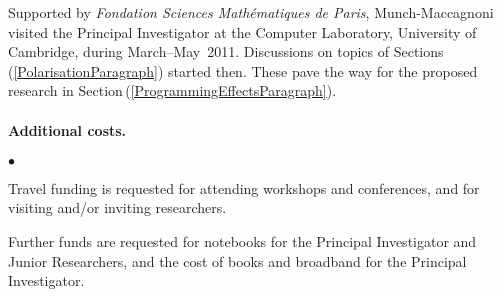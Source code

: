 \documentclass[11pt,twocolumn]{article}
\newenvironment{myitemize}
  {\begin{list}{$\bullet$}
  {\setlength{\topsep}{2pt}
   \setlength{\partopsep}{2pt}
   \setlength{\itemsep}{2.5pt}
   \setlength{\parsep}{2.5pt}
   \setlength{\leftmargin}{1em}
   \setlength{\labelwidth}{.5em}}}
  {\end{list}}
\newcommand{\hidefootnote}[2]{}
\newcommand{\pref}[1]{\,(\ref{#1})}
\newcommand{\Eg}{\emph{Eg.}}
\begin{document}
Supported by \emph{Fondation Sciences Math\'ematiques de Paris},
Munch-Maccagnoni visited the Principal Investigator at the Computer
Laboratory, University of Cambridge, during March--May~2011.  Discussions on
topics of Sections\pref{PolarisationParagraph} started then.  These pave the
way for the proposed research in Section\pref{ProgrammingEffectsParagraph}.


\paragraph*{Additional costs.}

\begin{myitemize}
\item
Travel funding is requested for attending workshops and 
conferences, \hidefootnote{\Eg~CALCO, CIE, CSL, CT, ICALP, ICFP, LICS, MFPS,
  POPL, PPDP, PSSL, RTA, TLCA, TYPES, WOLLIC.}, 
and for visiting and/or inviting researchers. \hidefootnote{\Eg~Aarhus
  (A\,Kock); 
  Bamberg (Mendler);
  Barcelona (J\,Kock);
  Bath (Power); 
  Berkeley (D\,Scott); 
  Birmingham (Escard\'o, Levy); 
  Bologna (Asperti, Dal Lago);
  Buffalo (Lawvere);
  Copenhagen (Birkedal, Filinski); 
  Darmstadt (Streicher); 
  Dublin (Dotsenko);
  Edinburgh (Leinster, Plotkin, A\,Simpson); 
  Genova (Moggi, Rosolini); 
  G\"oteborg (Coquand, Dybjer);
  Gunma (Hamana);
  Ljubljana (Bauer, Pretnar);
  London (Oliva);
  Manchester (Aczel);
  Marseille (Girard, Lafont, Regnier); 
  Montreal (Joyal, Makkai, Panangaden);
  Munich (Abel, Hofmann);
  Nice (C\,Simpson, Vallette);
  Nijmegen (Moerdijk);
  Nottingham (Altenkirch);
  Ottawa (P\,Scott); 
  Oxford (Abramsky, Coecke, Doring); 
  Paris (Burroni, Curien, Herbelin, Krivine, Melli\`es, Metayer);
  Philadelphia (Freyd, Pierce, Weirich);
  Pittsburgh (Avigad, Awodey, Harper, Pfenning, Reynolds);
  Portland (Sheard);
  Princeton (Warren);
  Strathclyde (Ghani, McBride);
  Swansea (Beckmann, Berger);
  Sydney (Garner, Lack, Street);
  Warsaw (Zawadowski).}.
\item
Further funds are requested for notebooks for the Principal Investigator and
Junior Researchers, and the cost of books and broadband for the Principal
Investigator.
\end{myitemize}
\end{document}
